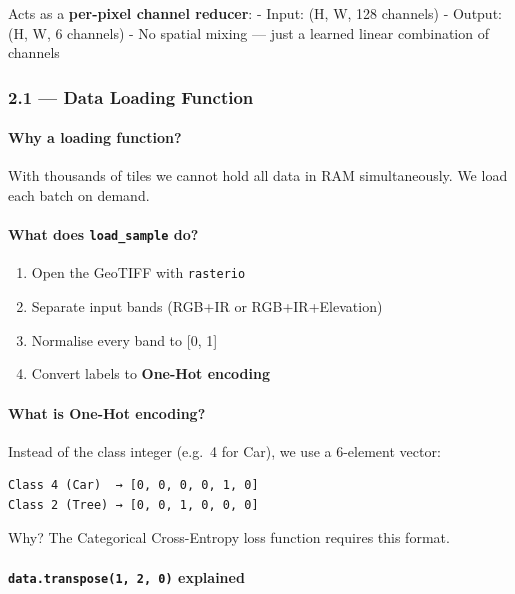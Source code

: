 \documentclass[11pt]{article}
\providecommand{\tightlist}{%
      \setlength{\itemsep}{0pt}\setlength{\parskip}{0pt}}
\begin{document}
Acts as a \textbf{per-pixel channel reducer}: - Input: (H, W, 128
channels) - Output: (H, W, 6 channels) - No spatial mixing --- just a
learned linear combination of channels

    \subsubsection{2.1 --- Data Loading
Function}\label{data-loading-function}

\paragraph{Why a loading function?}\label{why-a-loading-function}

With thousands of tiles we cannot hold all data in RAM simultaneously.
We load each batch on demand.

\paragraph{\texorpdfstring{What does \texttt{load\_sample}
do?}{What does load\_sample do?}}\label{what-does-load_sample-do}

\begin{enumerate}
\def\labelenumi{\arabic{enumi}.}
\tightlist
\item
  Open the GeoTIFF with \texttt{rasterio}
\item
  Separate input bands (RGB+IR or RGB+IR+Elevation)
\item
  Normalise every band to {[}0, 1{]}
\item
  Convert labels to \textbf{One-Hot encoding}
\end{enumerate}

\paragraph{What is One-Hot encoding?}\label{what-is-one-hot-encoding}

Instead of the class integer (e.g.~4 for Car), we use a 6-element
vector:

\begin{verbatim}
Class 4 (Car)  → [0, 0, 0, 0, 1, 0]
Class 2 (Tree) → [0, 0, 1, 0, 0, 0]
\end{verbatim}

Why? The Categorical Cross-Entropy loss function requires this format.

\paragraph{\texorpdfstring{\texttt{data.transpose(1,\ 2,\ 0)}
explained}{data.transpose(1, 2, 0) explained}}\label{data.transpose1-2-0-explained}
\end{document}
